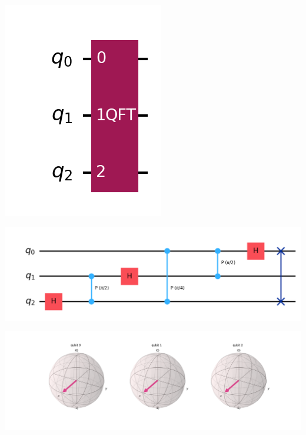 \documentclass{article}
\begin{document}
\begin{center}
	\includegraphics[scale=0.3]{QFT_1.png}
	\label{fig:QFT}
\end{center}

\begin{center}
	\includegraphics[scale=0.3]{QFT_1_transpiled.png}
	\label{fig:QFT-transpiled}
\end{center}

\begin{center}
	\includegraphics[scale=0.3]{QFT_1_bloch.png}
	\label{fig:QFT-bloch}
\end{center}
\end{document}
